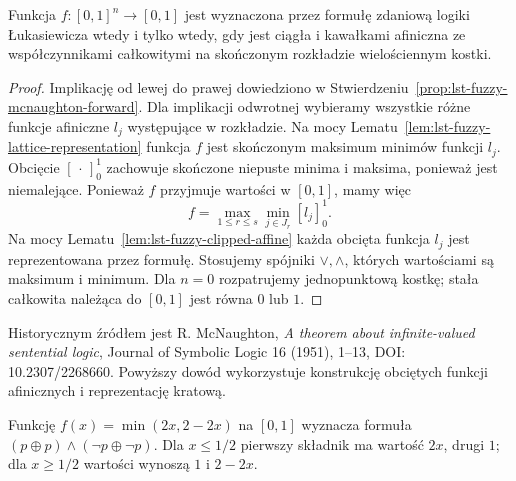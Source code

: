 \begin{twierdzenie}\label{thm:lst-fuzzy-mcnaughton}
Funkcja $f:[0,1]^n\to[0,1]$ jest wyznaczona przez formułę
zdaniową logiki Łukasiewicza wtedy i tylko wtedy, gdy jest
ciągła i kawałkami afiniczna ze współczynnikami całkowitymi
na skończonym rozkładzie wielościennym kostki.
\end{twierdzenie}
\begin{proof}
Implikację od lewej do prawej dowiedziono w
Stwierdzeniu~\ref{prop:lst-fuzzy-mcnaughton-forward}.
Dla implikacji odwrotnej wybieramy wszystkie różne funkcje afiniczne
$l_j$ występujące w rozkładzie. Na mocy
Lematu~\ref{lem:lst-fuzzy-lattice-representation} funkcja $f$ jest
skończonym maksimum minimów funkcji $l_j$.
Obcięcie $[\,\cdot\,]_0^1$ zachowuje skończone niepuste minima i
maksima, ponieważ jest niemalejące. Ponieważ $f$ przyjmuje
wartości w $[0,1]$, mamy więc
\[
 f=\max_{1\leq r\leq s}\min_{j\in J_r}[l_j]_0^1.
\]
Na mocy Lematu~\ref{lem:lst-fuzzy-clipped-affine} każda obcięta
funkcja $l_j$ jest reprezentowana przez formułę. Stosujemy
spójniki $\vee,\wedge$, których wartościami są maksimum i minimum.
Dla $n=0$ rozpatrujemy jednopunktową kostkę; stała całkowita
należąca do $[0,1]$ jest równa $0$ lub $1$.
\end{proof}
Historycznym źródłem jest R. McNaughton, \emph{A theorem about
infinite-valued sentential logic}, Journal of Symbolic Logic
16 (1951), 1--13, DOI: 10.2307/2268660.
Powyższy dowód wykorzystuje konstrukcję
obciętych funkcji afinicznych i reprezentację kratową.

\begin{przyklad}\label{ex:lst-fuzzy-mcnaughton-tent}
Funkcję $f(x)=\min(2x,2-2x)$ na $[0,1]$ wyznacza formuła
$(p\oplus p)\wedge(\neg p\oplus\neg p)$.
Dla $x\leq1/2$ pierwszy składnik ma wartość $2x$, drugi $1$;
dla $x\geq1/2$ wartości wynoszą $1$ i $2-2x$.
\begin{center}
\end{center}
\end{przyklad}

